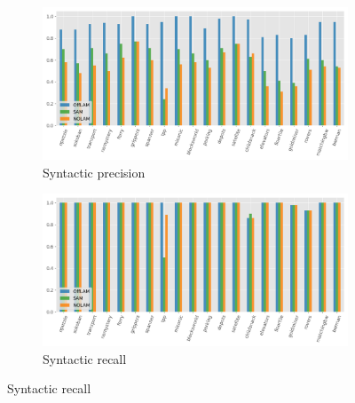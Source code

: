 
\begin{figure}[ht]
  \centering

  \begin{subfigure}[b]{0.45\textwidth}
    \includegraphics[width=\textwidth]{figures/10_traces/syn_precision.png}
    \caption{Syntactic precision}
  \end{subfigure}
  \hfill
  \begin{subfigure}[b]{0.45\textwidth}
    \includegraphics[width=\textwidth]{figures/10_traces/syn_recall.png}
    \caption{Syntactic recall}
  \end{subfigure}

  \vspace{1em}


\end{figure}
